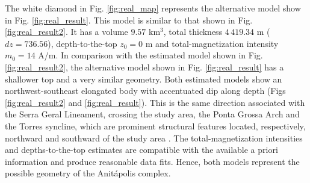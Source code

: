 The white diamond in Fig. \ref{fig:real_map} represents the alternative model 
show in Fig. \ref{fig:real_result}. This model is similar to that shown in 
Fig. \ref{fig:real_result2}. It has a volume $ 9.57 $ km$ ^3 $, total thickness 
$ 4\,419.34 $ m ($ dz = 736.56 $), depth-to-the-top $z_0 = 0$ m and 
total-magnetization intensity $m_0 = 14$ A/m. 
In comparison with the estimated model shown in Fig. \ref{fig:real_result2}, the 
alternative model shown in Fig. \ref{fig:real_result} has a shallower top and a 
very similar geometry.
Both estimated models show an northwest-southeast elongated body with accentuated dip 
along depth (Figs \ref{fig:real_result2} and \ref{fig:real_result}).
This is the same direction associated with the Serra Geral Lineament, 
crossing the study area, the Ponta Grossa Arch and the Torres syncline,
which are prominent structural features located, respectively, 
northward and southward of the study area \citep[e.g., ][ p. 535]{scheibe-etal2005}.
The total-magnetization intensities and depths-to-the-top estimates are compatible with 
the available a priori information and produce reasonable data fits.
Hence, both models represent the possible geometry of the Anit{\'a}polis complex. 